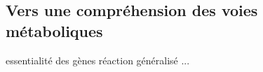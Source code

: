 
\begin{refsegment}
\chapter{Vers une compréhension des voies métaboliques}
essentialité des gènes
réaction généralisé ...
\subbibliography
\end{refsegment}